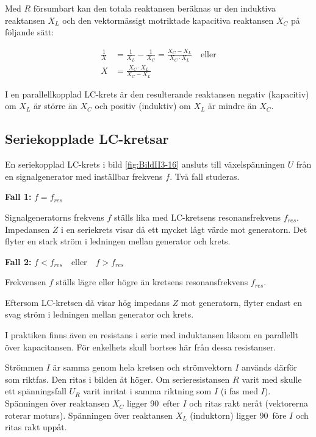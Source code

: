 Med \(R\) försumbart kan den totala reaktansen beräknas ur den induktiva reaktansen \(X_L\)
och den vektormässigt motriktade kapacitiva reaktansen \(X_C\) på följande sätt:

\begin{align*}
	\frac{1}{X} &= \frac{1}{X_L} - \frac{1}{X_C} = \frac{X_C - X_L}{X_C \cdot X_L}
	\quad \text{eller} \\
	X &= \frac{X_C \cdot X_L}{X_C - X_L}
\end{align*}

I en parallellkopplad LC-krets är den resulterande reaktansen negativ
(kapacitiv) om \(X_L\) är större än \(X_C\) och positiv (induktiv) om \(X_L\) är
mindre än \(X_C\).

\subsection{Seriekopplade LC-kretsar}


En seriekopplad LC-krets i bild \ref{fig:BildII3-16} ansluts till
växelspänningen \(U\) från en signalgenerator med inställbar frekvens \(f\).
Två fall studeras.

\textbf{Fall 1:} \(f = f_{res}\)

Signalgeneratorns frekvens \(f\) ställs lika med LC-kretsens resonansfrekvens
\(f_{res}\).
Impedansen \(Z\) i en seriekrets visar då ett mycket lågt värde mot generatorn.
Det flyter en stark ström i ledningen mellan generator och krets.

\textbf{Fall 2:} \(f < f_{res} \quad \text{eller} \quad f > f_{res}\)

Frekvensen \(f\) ställs lägre eller högre än kretsens resonansfrekvens
\(f_{res}\).

Eftersom LC-kretsen då visar hög impedans \(Z\) mot generatorn, flyter
endast en svag ström i ledningen mellan generator och krets.

I praktiken finns även en resistans i serie med induktansen liksom en
parallellt över kapacitansen.
För enkelhets skull bortses här från dessa resistanser.

Strömmen \(I\) är samma genom hela kretsen och strömvektorn \(I\) används
därför som riktfas.
Den ritas i bilden åt höger.
Om serieresistansen \(R\) varit med skulle ett spänningsfall \(U_R\) varit
inritat i samma riktning som \(I\) (i fas med \(I\)).
Spänningen över reaktansen \(X_C\) ligger 90\degree~efter \(I\) och ritas
rakt neråt (vektorerna roterar moturs).
Spänningen över reaktansen \(X_L\) (induktorn) ligger 90\degree~före \(I\) och
ritas rakt uppåt.

